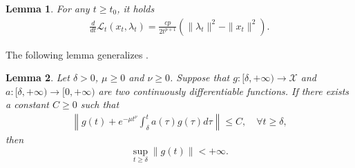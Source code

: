 \documentclass[review]{elsarticle}
\newtheorem{lemma}{Lemma}[section]
\begin{document}
	\begin{lemma}\label{lemma012}\cite[Lemma 2.4]{ChbaniRBOn(2024)}
		For any $t\geq t_0$, it holds
		\begin{eqnarray*}
			\frac{d}{dt}\mathcal{L}_{t}(x_t, \lambda_t)=\frac{cp}{2t^{p+1}}\left(\|\lambda_t\|^2-\|x_t\|^2\right).
		\end{eqnarray*}
	\end{lemma}
	
The following lemma generalizes  \cite[Lemma 6]{HeHFiietal(2022)}. 
	\begin{lemma}\label{lemma2.2}
		 Let $\delta>0$,  $\mu\geq0$ and $\nu\geq0$. Suppose that  $g:[\delta,+\infty)\rightarrow \mathcal{X}$ and $a : [\delta,+\infty)\rightarrow[0,+\infty)$ are two continuously differentiable functions.  If there exists a constant $C\geq0$ such that
		\begin{eqnarray}\label{zfe2}
			\left\|g(t)+e^{-\mu t^{\nu}}\int_{\delta}^{t}a(\tau)g(\tau)d\tau\right\|\leq C, \quad \forall t\geq \delta,
		\end{eqnarray}
		then
		$$\sup_{t\geq \delta}\|g(t)\|<+\infty.$$
	\end{lemma}
	
\end{document}
